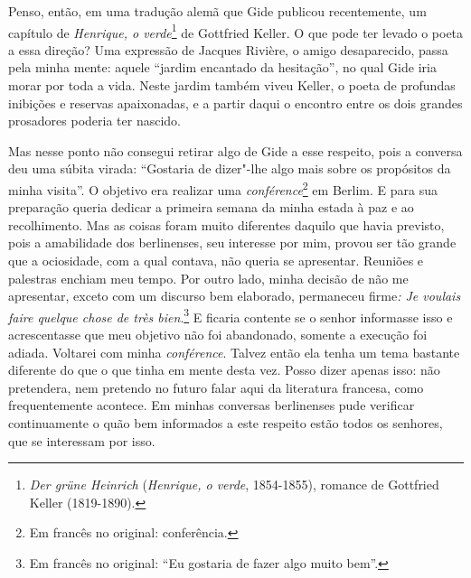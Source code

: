 Penso, então, em uma tradução alemã que Gide publicou recentemente, um
capítulo de \emph{Henrique, o verde}\footnote{\emph{Der grüne
  Heinrich} (\emph{Henrique, o verde}, 1854-1855), romance de Gottfried Keller
  (1819-1890). \versal{[N. E.]}} de Gottfried Keller. O que pode ter levado o poeta a
essa direção? Uma expressão de Jacques Rivière, o amigo desaparecido,
passa pela minha mente: aquele ``jardim encantado da hesitação'', no
qual Gide iria morar por toda a vida. Neste jardim também viveu Keller,
o poeta de profundas inibições e reservas apaixonadas, e a partir daqui
o encontro entre os dois grandes prosadores poderia ter nascido.

Mas nesse ponto não consegui retirar algo de Gide a esse
respeito, pois a conversa deu uma súbita virada: ``Gostaria de dizer"-lhe
algo mais sobre os propósitos da minha visita''. O objetivo era realizar
uma \emph{conférence}\footnote{Em francês no original: conferência. \versal{[N. T.]}} em Berlim. E para sua preparação queria dedicar a
primeira semana da minha estada à paz e ao recolhimento. Mas as
coisas foram muito diferentes daquilo que havia previsto, pois a
amabilidade dos berlinenses, seu interesse por mim, provou ser tão
grande que a ociosidade, com a qual contava, não queria se apresentar.
Reuniões e palestras enchiam meu tempo. Por
outro lado, minha decisão de não me apresentar, exceto com um discurso
bem elaborado, permaneceu firme\emph{: Je voulais faire quelque chose de
très bien}.\footnote{Em francês no original: ``Eu gostaria de fazer algo muito bem''. \versal{[N. T.]}}
E ficaria contente se o senhor informasse isso e acrescentasse que
meu objetivo não foi abandonado, somente a execução foi adiada. Voltarei com minha \emph{conférence}.
Talvez então ela tenha um tema bastante diferente do que o que tinha em
mente desta vez. Posso dizer apenas isso: não pretendera, nem pretendo
no futuro falar aqui da literatura francesa, como frequentemente
acontece. Em minhas conversas berlinenses pude verificar continuamente
o quão bem informados a este respeito estão todos os senhores, que se
interessam por isso.

